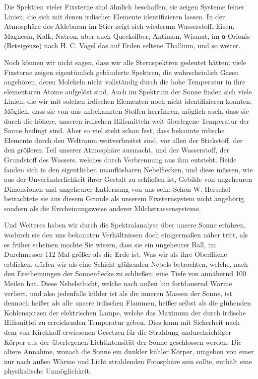 \documentclass[a4paper, 11pt, oneside, german]{article}
\begin{document}
Die Spektren vieler Fixsterne sind ähnlich beschaffen, sie zeigen Systeme feiner Linien, die sich mit denen irdischer Elemente identifizieren lassen. In der Atmosphäre des Aldebaran im Stier zeigt sich wiederum Wasserstoff, Eisen, Magnesia, Kalk, Natron, aber auch Quecksilber, Antimon, Wismut, im α Orionis (Beteigeuze) nach H. C. Vogel das auf Erden seltene Thallium, und so weiter.

Noch können wir nicht sagen, dass wir alle Sternspektren gedeutet hätten; viele Fixsterne zeigen eigentümlich gebänderte Spektren, die wahrscheinlich Gasen angehören, deren Molekeln nicht vollständig durch die hohe Temperatur in ihre elementaren Atome aufgelöst sind. Auch im Spektrum der Sonne finden sich viele Linien, die wir mit solchen irdischen Elementen noch nicht identifizieren konnten. Möglich, dass sie von uns unbekannten Stoffen herrühren, möglich auch, dass sie durch die höhere, unseren irdischen Hilfsmitteln weit überlegene Temperatur der Sonne bedingt sind. Aber so viel steht schon fest, dass bekannte irdische Elemente durch den Weltraum weitverbreitet sind, vor allen der Stickstoff, der den größeren Teil unserer Atmosphäre ausmacht, und der Wasserstoff, der Grundstoff des Wassers, welches durch Verbrennung aus ihm entsteht. Beide fanden sich in den eigentlichen unauflösbaren Nebelflecken, und diese müssen, wie aus der Unveränderlichkeit ihrer Gestalt zu schließen ist, Gebilde von ungeheuren Dimensionen und ungeheurer Entfernung von uns sein. Schon W. Herschel betrachtete sie aus diesem Grunde als unserem Fixsternsystem nicht angehörig, sondern als die Erscheinungsweise anderer Milchstrassensysteme.

Und Weiteres haben wir durch die Spektralanalyse über unsere Sonne erfahren, wodurch sie den uns bekannten Verhältnissen doch einigermaßen näher tritt, als es früher scheinen mochte Sie wissen, dass sie ein ungeheurer Ball, im Durchmesser 112 Mal größer als die Erde ist. Was wir als ihre Oberfläche erblicken, dürfen wir als eine Schicht glühenden Nebels betrachten, welche, nach den Erscheinungen der Sonnenflecke zu schließen, eine Tiefe von annähernd 100 Meilen hat. Diese Nebelschicht, welche nach außen hin fortdauernd Wärme verliert, und also jedenfalls kühler ist als die inneren Massen der Sonne, ist dennoch heißer als alle unsere irdischen Flammen, heißer selbst als die glühenden Kohlenspitzen der elektrischen Lampe, welche das Maximum der durch irdische Hilfsmittel zu erreichenden Temperatur geben. Dies kann mit Sicherheit nach dem von Kirchhoff erwiesenen Gesetzen für die Strahlung undurchsichtiger Körper aus der überlegenen Lichtintensität der Sonne geschlossen werden. Die ältere Annahme, wonach die Sonne ein dunkler kühler Körper, umgeben von einer nur nach außen Wärme und Licht strahlenden Fotosphäre sein sollte, enthält eine physikalische Unmöglichkeit.
\end{document}
